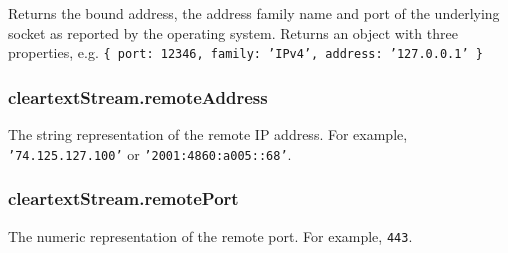 Returns the bound address, the address family name and port of the
underlying socket as reported by the operating system. Returns an object
with three properties, e.g.
\texttt{\{ port: 12346, family: 'IPv4', address: '127.0.0.1' \}}

\subsubsection{cleartextStream.remoteAddress}

The string representation of the remote IP address. For example,
\texttt{'74.125.127.100'} or \texttt{'2001:4860:a005::68'}.

\subsubsection{cleartextStream.remotePort}

The numeric representation of the remote port. For example,
\texttt{443}.
